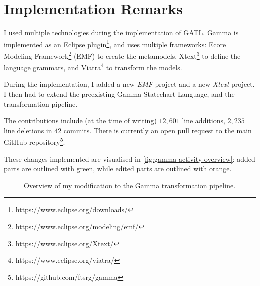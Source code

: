 \section{Implementation Remarks}\label{sec:implementation-remarks}

I used multiple technologies during the implementation of GATL. Gamma is implemented as an Eclipse plugin\footnote{https://www.eclipse.org/downloads/}, and uses multiple frameworks: Ecore Modeling Framework\footnote{https://www.eclipse.org/modeling/emf/} (EMF) to create the metamodels, Xtext\footnote{https://www.eclipse.org/Xtext/} to define the language grammars, and Viatra\footnote{https://www.eclipse.org/viatra/} to transform the models.

During the implementation, I added a new \emph{EMF} project and a new \emph{Xtext} project. I then had to extend the preexisting Gamma Statechart Language, and the transformation pipeline.

The contributions include (at the time of writing) \(12,601\) line additions, \(2,235\) line deletions in \(42\) commits. There is currently an open pull request to the main GitHub repository\footnote{https://github.com/ftsrg/gamma}.

These changes implemented are visualised in \autoref{fig:gamma-activity-overview}: added parts are outlined with green, while edited parts are outlined with orange.

\begin{figure}[!ht]
	\centering
	
	\caption{Overview of my modification to the Gamma transformation pipeline.}
	\label{fig:gamma-activity-overview}
\end{figure}
